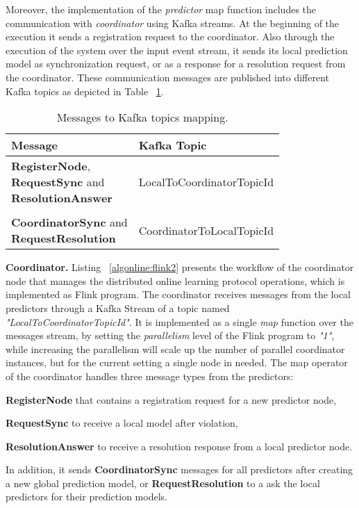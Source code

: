 \par Moreover, the implementation of  the \textit{predictor} map function includes the communication  with \textit{coordinator} using Kafka streams. At the beginning of the execution it sends a registration request to the coordinator. Also through the execution of the system over the input event stream,  it sends  its local prediction model as synchronization request,  or as a response for a resolution request from the coordinator. These communication messages are published into different Kafka topics as depicted in Table ~\ref{tab:messagesToTopics}. 

\begin{table}[h]
	\caption{Messages to Kafka topics mapping.}
	\label{tab:messagesToTopics}
	\begin{tabular}{p{3cm}l}
		\toprule
		Message &Kafka Topic\\
		\midrule
		\parbox[t]{4cm}{\textbf{RegisterNode}, \\ \textbf{RequestSync} and \\\textbf{ResolutionAnswer} } &LocalToCoordinatorTopicId\\ \\
		
			  \parbox[t]{4cm}{\textbf{CoordinatorSync} and \\ \textbf{RequestResolution}} &CoordinatorToLocalTopicId\\
		
		\bottomrule
	\end{tabular}
\end{table}


\textbf{Coordinator.} Listing ~\ref{algonline:flink2} presents the workflow of the coordinator node that manages the distributed online learning protocol operations, which is implemented as Flink program. The coordinator receives messages from the local predictors through a Kafka Stream of a topic named \textit{"LocalToCoordinatorTopicId"}. It is implemented as a single \textit{map} function over the messages stream, by setting the \textit{parallelism} level of the Flink program to \textit{"1"}, while increasing the parallelism will scale up the number of parallel coordinator instances, but for the current setting a single node in needed. The map operator of the coordinator  handles three message types from the predictors: \begin{enumerate*}[(i)]
	\item \textbf{RegisterNode} that contains  a registration request for a new predictor node,
	\item \textbf{RequestSync} to receive a local model after violation,
	\item \textbf{ResolutionAnswer} to receive a resolution response from a local predictor node.  
\end{enumerate*}  
 In addition, it sends \textbf{CoordinatorSync} messages for all predictors after creating a new global prediction model, or \textbf{RequestResolution} to a ask the local predictors for their prediction models.
 

